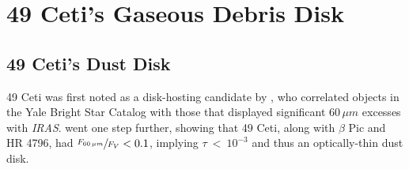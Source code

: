 \section{49 Ceti's Gaseous Debris Disk}
\subsection{49 Ceti's Dust Disk}
49 Ceti was first noted as a disk-hosting candidate by \citet*{Sada86}, who correlated objects in the Yale Bright Star Catalog with those that displayed significant 60\,$\mu m$ excesses with \textit{IRAS}. \cite{Jura93} went one step further, showing that 49 Ceti, along with $\beta$ Pic and HR 4796, had $\sfrac{F_{60\,\mu m}}{F_{V}} < 0.1$, implying $\tau~<~10^{-3}$ and thus an optically-thin dust disk. 








